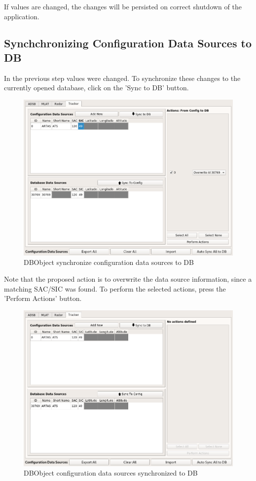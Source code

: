 If values are changed, the changes will be persisted on correct shutdown of the application.

\subsection{Synchchronizing Configuration Data Sources to DB}

In the previous step values were changed. To synchronize these changes to the currently opened database, click on the 'Sync to DB' button.

\begin{figure}[H]
  \center
    \includegraphics[width=16cm,frame]{figures/manage_data_sources_edit_ds_sync2db.png}
  \caption{DBObject synchronize configuration data sources to DB}
\end{figure}

Note that the proposed action is to overwrite the data source information, since a matching SAC/SIC was found. To perform the selected actions, press the 'Perform Actions' button.

\begin{figure}[H]
  \center
    \includegraphics[width=16cm,frame]{figures/manage_data_sources_edit_ds_cfg2dbsynced.png}
  \caption{DBObject configuration data sources synchronized to DB}
\end{figure}

